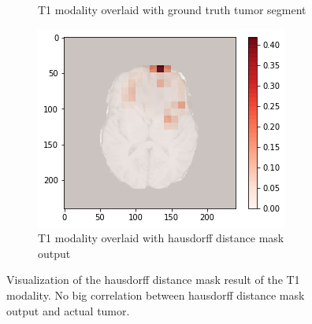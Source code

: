 \begin{figure}[H]
\begin{subfigure}{.33\textwidth}
        \caption{T1 modality overlaid with ground truth tumor segment}
    \end{subfigure}
        \begin{subfigure}{.33\textwidth}
        \centering
        \includegraphics[width=\linewidth]{chapters/07_brats3d/images/09_t1_hdm10.png}
        \caption{T1 modality overlaid with hausdorff distance mask output}
    \end{subfigure}
    \caption{Visualization of the hausdorff distance mask result of the T1 modality. No big correlation between hausdorff distance mask output and actual tumor.}
\end{figure}

